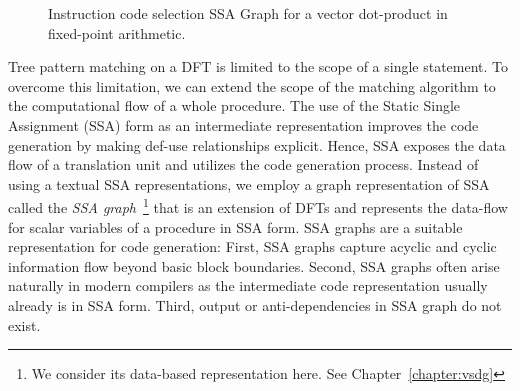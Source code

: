 \begin{figure}[ht]
\begin{center}

  \end{center}
  \caption{Instruction code selection SSA Graph for a vector dot-product in
    fixed-point arithmetic.}\label{fig:ssa_graph}
\end{figure}

Tree pattern matching on a DFT is limited to the scope of a single
statement.  To overcome this limitation, we can extend the scope of
the matching algorithm to the computational flow of a whole procedure.
The use of the Static Single Assignment (SSA) form as an intermediate
representation improves the code generation by making def-use
relationships explicit. Hence, SSA exposes the data flow of a
translation unit and utilizes the code generation process.  Instead of
using a textual SSA representations, we employ a graph representation
of SSA called the \emph{SSA graph}~\footnote{We consider its data-based representation here. See Chapter~\ref{chapter:vsdg}} that is an extension of DFTs and
represents the data-flow for scalar variables of a procedure in SSA form.  SSA graphs are a
suitable representation for code generation: First, SSA graphs capture
acyclic and cyclic information flow beyond basic block
boundaries. Second, SSA graphs often arise naturally in modern
compilers as the intermediate code representation usually already is
in SSA form. Third, output or anti-dependencies in SSA graph do not
exist.

